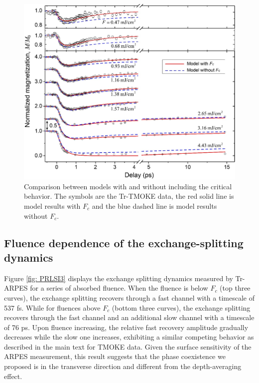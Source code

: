 \begin{figure}
	\label{fig: PRLSI2}
	\begin{center}
		\includegraphics[width=150mm]{figs/PRLSI2}
	\end{center}
	\caption{Comparison between models with and without including the critical behavior. The symbols are the Tr-TMOKE data, the red solid line is model results with $F_c$ and the blue dashed line is model results without $F_c$.}
\end{figure}

\subsection{Fluence dependence of the exchange-splitting dynamics}

Figure \ref{fig: PRLSI3} displays the exchange splitting dynamics measured by Tr-ARPES for a series of absorbed fluence. When the fluence is below $F_c$ (top three curves), the exchange splitting recovers through a fast channel with a timescale of 537 fs. While for fluences above $F_c$ (bottom three curves), the exchange splitting recovers through the fast channel and an additional slow channel with a timescale of 76 ps. Upon fluence increasing, the relative fast recovery amplitude gradually decreases while the slow one increases, exhibiting a similar competing behavior as described in the main text for TMOKE data. Given the surface sensitivity of the ARPES measurement, this result suggests that the phase coexistence we proposed is in the transverse direction and different from the depth-averaging effect.

